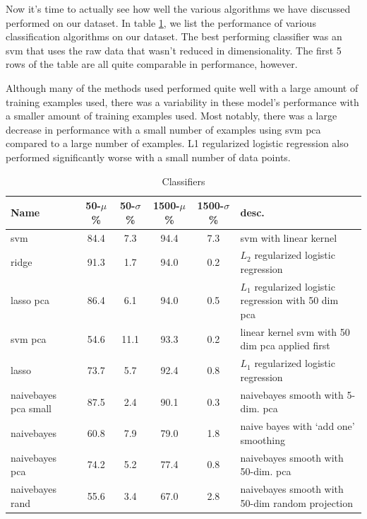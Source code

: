
%

Now it's time to actually see how well the various algorithms we have discussed performed on our dataset. In table \ref{tab:Classifiers}, we list the performance of various classification algorithms on our dataset. The best performing classifier was an svm that uses the raw data that wasn't reduced in dimensionality. The first 5 rows of the table are all quite comparable in performance, however. 

Although many of the methods used performed quite well with a large amount of training examples used, there was a variability in these model's performance with a smaller amount of training examples used. Most notably, there was a large decrease in performance with a small number of examples using svm pca compared to a large number of examples. L1 regularized logistic regression also performed significantly worse with a small number of data points.

\begin{center}
\begin{table}
\begin{tabular}{lccccl}
\hline
Name & 50-$\mu$ \% & 50-$\sigma$ \% & 1500-$\mu$ \% & 1500-$\sigma$ \% &  desc.\\
\hline
svm & 84.4 & 7.3 & 94.4 & 7.3 & svm with linear kernel\\
ridge & 91.3 & 1.7 & 94.0 & 0.2 & $L_2$ regularized logistic regression\\
lasso pca &  86.4 & 6.1& 94.0 & 0.5 & $L_1$ regularized logistic regression with 50 dim pca\\
svm pca &54.6 & 11.1&  93.3 & 0.2 &  linear kernel svm with 50 dim pca applied first\\
lasso & 73.7& 5.7 & 92.4 & 0.8 & $L_1$ regularized logistic regression\\
naivebayes pca small & 87.5& 2.4 & 90.1 & 0.3  & naivebayes smooth with 5-dim. pca\\
naivebayes & 60.8 & 7.9& 79.0 & 1.8& naive bayes with `add one' smoothing\\
naivebayes pca  & 74.2 & 5.2 & 77.4 & 0.8 & naivebayes smooth with 50-dim. pca\\
naivebayes rand & 55.6 & 3.4 & 67.0 & 2.8  & naivebayes smooth with 50-dim random projection\\
\end{tabular}
\caption{Classifiers}
\label{tab:Classifiers}
\par
\end{table}
\end{center}



